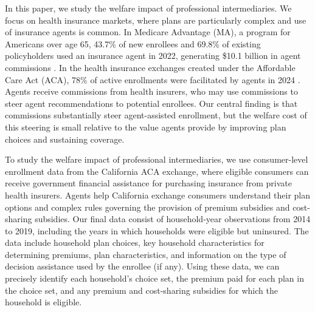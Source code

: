 \documentclass[12pt]{article}
\begin{document}
In this paper, we study the welfare impact of professional intermediaries. We focus on health insurance markets, where plans are particularly complex \citep{abaluck2011, ketcham2012, gruber2017} and use of insurance agents is common. In Medicare Advantage (MA), a program for Americans over age 65, 43.7\% of new enrollees and 69.8\% of existing policyholders used an insurance agent in 2022, generating \$10.1 billion in agent commissions \citep{meyers2026}. In the health insurance exchanges created under the Affordable Care Act (ACA), 78\% of active enrollments were facilitated by agents in 2024 \citep{gurel2024}. Agents receive commissions from health insurers, who may use commissions to steer agent recommendations to potential enrollees. Our central finding is that commissions substantially steer agent-assisted enrollment, but the welfare cost of this steering is small relative to the value agents provide by improving plan choices and sustaining coverage.




To study the welfare impact of professional intermediaries, we use consumer-level enrollment data from the California ACA exchange, where eligible consumers can receive government financial assistance for purchasing insurance from private health insurers. Agents help California exchange consumers understand their plan options and complex rules governing the provision of premium subsidies and cost-sharing subsidies. Our final data consist of \nHHfull{} household-year observations from 2014 to 2019, including the years in which households were eligible but uninsured. The data include household plan choices, key household characteristics for determining premiums, plan characteristics, and information on the type of decision assistance used by the enrollee (if any). Using these data, we can precisely identify each household's choice set, the premium paid for each plan in the choice set, and any premium and cost-sharing subsidies for which the household is eligible.
\end{document}
